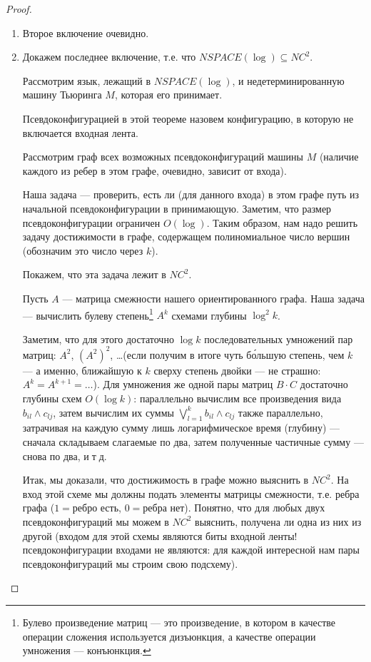 \begin{proof} 
	\begin{enumerate}
	\item Второе включение очевидно.

	\item Докажем последнее включение, т.е. что $NSPACE(\log) \subseteq NC^2$.
	
	Рассмотрим язык, лежащий в $NSPACE(\log)$, и недетерминированную машину Тьюринга $M$, которая его принимает. 

	\begin{Def}
		Псевдоконфигурацией в этой теореме назовем конфигурацию, в которую не включается входная лента.
	\end{Def}

	Рассмотрим граф всех возможных псевдоконфигураций машины $M$ (наличие каждого из ребер в этом графе, очевидно, зависит от входа).

	Наша задача --- проверить, есть ли (для данного входа) в этом графе путь из начальной псевдоконфигурации в принимающую.
	Заметим, что размер псевдоконфигурации ограничен $O(\log)$. Таким образом, нам надо решить задачу достижимости в графе, содержащем
	полиномиальное число вершин (обозначим это число через $k$).

	Покажем, что эта задача лежит в $NC^2$. 
	
	Пусть $A$ --- матрица смежности нашего ориентированного графа.
	Наша задача --- вычислить булеву степень\footnote{Булево произведение
	матриц --- это произведение, в котором в качестве операции сложения
	используется дизъюнкция, а качестве операции умножения --- конъюнкция.} 
	$A^k$ схемами глубины $\log^2k$.

	Заметим, что для этого достаточно $\log k$ последовательных умножений 
	пар матриц: $A^2$, $(A^2)^2$, \ldots (если получим в итоге чуть б\'ольшую
	степень, чем $k$ --- а именно, ближайшую к $k$ сверху степень двойки ---
	не страшно: $A^k=A^{k+1}=\ldots$). Для умножения же одной пары матриц 
	$B\cdot C$ достаточно глубины схем $O(\log k)$:
	параллельно вычислим все произведения вида $b_{il}\land c_{lj}$,
	затем вычислим их суммы $\bigvee_{l=1}^k b_{il}\land c_{lj}$ также параллельно,
	затрачивая на каждую сумму лишь логарифмическое время (глубину) ---
	сначала складываем слагаемые по два, затем полученные частичные сумму ---
	снова по два, и$\;$т$\;$д.

	Итак, мы доказали, что достижимость в графе можно выяснить в $NC^2$.
	На вход этой схеме мы должны подать элементы матрицы смежности,
	т.е. ребра графа ($1=\textrm{ребро есть}$, $0=\textrm{ребра нет}$).
	Понятно, что для любых двух псевдоконфигураций мы можем в $NC^2$ выяснить,
	получена ли одна из них из другой (входом для этой схемы являются
	биты входной ленты! псевдоконфигурации входами не являются: для каждой
	интересной нам пары псевдоконфигураций мы строим свою подсхему).


\end{enumerate}
\end{proof}
